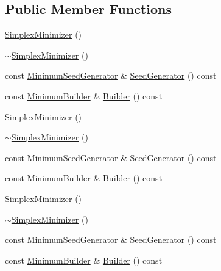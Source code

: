 \subsection*{Public Member Functions}
\begin{DoxyCompactItemize}
\item 
\mbox{\hyperlink{classROOT_1_1Minuit2_1_1SimplexMinimizer_a7691b4e4e38176c01ba0f5b5f0acd33f}{Simplex\+Minimizer}} ()
\item 
\mbox{\hyperlink{classROOT_1_1Minuit2_1_1SimplexMinimizer_a52f955e2ed5e48a5816300d1c82c4841}{$\sim$\+Simplex\+Minimizer}} ()
\item 
const \mbox{\hyperlink{classROOT_1_1Minuit2_1_1MinimumSeedGenerator}{Minimum\+Seed\+Generator}} \& \mbox{\hyperlink{classROOT_1_1Minuit2_1_1SimplexMinimizer_a7385d3ee5e4a48a796b11b51f7f0c408}{Seed\+Generator}} () const
\item 
const \mbox{\hyperlink{classROOT_1_1Minuit2_1_1MinimumBuilder}{Minimum\+Builder}} \& \mbox{\hyperlink{classROOT_1_1Minuit2_1_1SimplexMinimizer_a388494c3f9b45ce6c5d91decef737608}{Builder}} () const
\item 
\mbox{\hyperlink{classROOT_1_1Minuit2_1_1SimplexMinimizer_a7691b4e4e38176c01ba0f5b5f0acd33f}{Simplex\+Minimizer}} ()
\item 
\mbox{\hyperlink{classROOT_1_1Minuit2_1_1SimplexMinimizer_a52f955e2ed5e48a5816300d1c82c4841}{$\sim$\+Simplex\+Minimizer}} ()
\item 
const \mbox{\hyperlink{classROOT_1_1Minuit2_1_1MinimumSeedGenerator}{Minimum\+Seed\+Generator}} \& \mbox{\hyperlink{classROOT_1_1Minuit2_1_1SimplexMinimizer_a7385d3ee5e4a48a796b11b51f7f0c408}{Seed\+Generator}} () const
\item 
const \mbox{\hyperlink{classROOT_1_1Minuit2_1_1MinimumBuilder}{Minimum\+Builder}} \& \mbox{\hyperlink{classROOT_1_1Minuit2_1_1SimplexMinimizer_a388494c3f9b45ce6c5d91decef737608}{Builder}} () const
\item 
\mbox{\hyperlink{classROOT_1_1Minuit2_1_1SimplexMinimizer_a7691b4e4e38176c01ba0f5b5f0acd33f}{Simplex\+Minimizer}} ()
\item 
\mbox{\hyperlink{classROOT_1_1Minuit2_1_1SimplexMinimizer_a52f955e2ed5e48a5816300d1c82c4841}{$\sim$\+Simplex\+Minimizer}} ()
\item 
const \mbox{\hyperlink{classROOT_1_1Minuit2_1_1MinimumSeedGenerator}{Minimum\+Seed\+Generator}} \& \mbox{\hyperlink{classROOT_1_1Minuit2_1_1SimplexMinimizer_a7385d3ee5e4a48a796b11b51f7f0c408}{Seed\+Generator}} () const
\item 
const \mbox{\hyperlink{classROOT_1_1Minuit2_1_1MinimumBuilder}{Minimum\+Builder}} \& \mbox{\hyperlink{classROOT_1_1Minuit2_1_1SimplexMinimizer_a388494c3f9b45ce6c5d91decef737608}{Builder}} () const
\end{DoxyCompactItemize}


